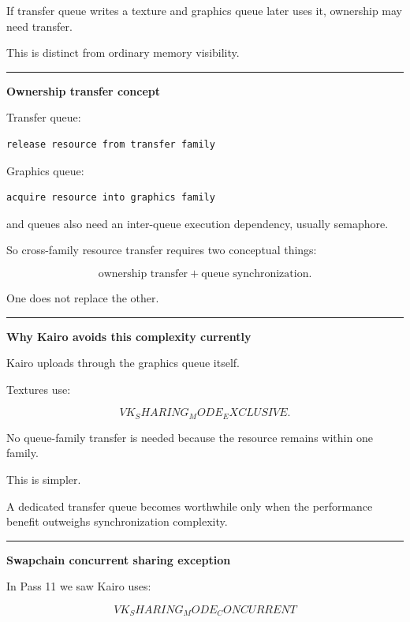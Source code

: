 If transfer queue writes a texture and graphics queue later uses it, ownership may need transfer.

This is distinct from ordinary memory visibility.

\begin{center}\rule{0.5\linewidth}{0.5pt}\end{center}

\textbf{Ownership transfer concept}

Transfer queue:

\begin{verbatim}
release resource from transfer family
\end{verbatim}

Graphics queue:

\begin{verbatim}
acquire resource into graphics family
\end{verbatim}

and queues also need an inter-queue execution dependency, usually semaphore.

So cross-family resource transfer requires two conceptual things:

\[
\boxed{
\text{ownership transfer}
+
\text{queue synchronization}.
}
\]

One does not replace the other.

\begin{center}\rule{0.5\linewidth}{0.5pt}\end{center}

\textbf{Why Kairo avoids this complexity currently}

Kairo uploads through the graphics queue itself.

Textures use:

\[
VK_SHARING_MODE_EXCLUSIVE.
\]

No queue-family transfer is needed because the resource remains within one family.

This is simpler.

A dedicated transfer queue becomes worthwhile only when the performance benefit outweighs synchronization complexity.

\begin{center}\rule{0.5\linewidth}{0.5pt}\end{center}

\textbf{Swapchain concurrent sharing exception}

In Pass 11 we saw Kairo uses:

\[
VK_SHARING_MODE_CONCURRENT
\]

